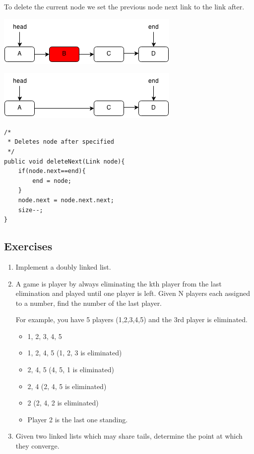 \documentclass[11pt,oneside]{book}
\makeatletter
\def\maxwidth#1{\ifdim\Gin@nat@width>#1 #1\else\Gin@nat@width\fi}
\makeatother
\begin{document}
To delete the current node we set the previous node next link to the link after.

\includegraphics[width=\maxwidth{\textwidth}]{linkedlistrem.png}

\includegraphics[width=\maxwidth{\textwidth}]{linkedlistrem2.png}

\begin{lstlisting}
/*
 * Deletes node after specified
 */
public void deleteNext(Link node){
    if(node.next==end){
        end = node;
    }
    node.next = node.next.next;
    size--;
}
\end{lstlisting}

\subsection{Exercises}

\begin{enumerate}
\item Implement a doubly linked list.
\item A game is player by always eliminating the kth player from the last elimination and played until one player is left. Given N players each assigned to a number, find the number of the last player.

For example, you have 5 players (1,2,3,4,5) and the 3rd player is eliminated.

\begin{itemize}
\item 1, 2, 3, 4, 5 
\item 1, 2, 4, 5 (1, 2, 3 is eliminated)
\item 2, 4, 5 (4, 5, 1 is eliminated)
\item 2, 4 (2, 4, 5 is eliminated)
\item 2 (2, 4, 2 is eliminated)
\item Player 2 is the last one standing.
\end{itemize}
\item Given two linked lists which may share tails, determine the point at which they converge.
\end{enumerate}
\end{document}
